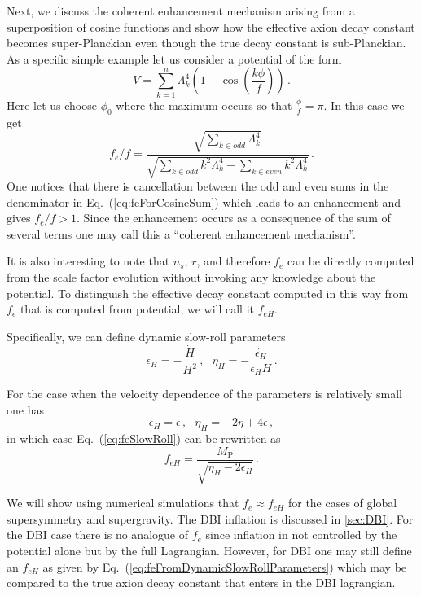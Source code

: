 \documentclass[12pt]{article}
\begin{document}
Next, we discuss the coherent enhancement mechanism arising from a superposition of cosine functions and show how the effective axion decay constant becomes super-Planckian even though the true decay constant is sub-Planckian.
As a specific simple example let us consider a potential of the form
\begin{equation} \label{eq:cosineSumPotential}
  V = \sum_{k = 1}^n \Lambda_k^4 \left(1 - \cos\left(\frac{k\phi}{f}\right)\right)\,.
\end{equation}
Here let us choose $\phi_0$ where the maximum occurs so that $\frac{\phi}{f} = \pi$.
In this case we get
\begin{equation} \label{eq:feForCosineSum}
  {f_e} / f = \frac
    {\sqrt{\sum_{k \in odd} \Lambda_k^4}}
    {\sqrt{\sum_{k \in odd} k^2 \Lambda_k^4 - \sum_{k \in even} k^2 \Lambda_k^4}}\,.
\end{equation}
One notices that there is cancellation between the odd and even sums in the denominator in Eq.~(\ref{eq:feForCosineSum}) which leads to an enhancement and gives $f_e / f > 1$.
Since the enhancement occurs as a consequence of the sum of several terms one may call this a ``coherent enhancement mechanism''.

It is also interesting to note that $n_s$, $r$, and therefore $f_e$ can be directly computed from the scale factor evolution without invoking any knowledge about the potential.
To distinguish the effective decay constant computed in this way from $f_e$ that is computed from potential, we will call it $f_{eH}$.

Specifically, we can define dynamic slow-roll parameters
\begin{equation} \label{eq:slowRollParametersDynamic}
  \epsilon_H = -\frac{\dot H}{H^2}\,,
  ~~~ \eta_H = -\frac{\dot{\epsilon_H}}{\epsilon_H H}\,.
\end{equation}

For the case when the velocity dependence of the parameters is relatively small one has
\begin{equation} \label{eq:slowRollParametersDynamicFromStatic}
  \epsilon_H = \epsilon\,,
  ~~~ \eta_H = -2 \eta + 4 \epsilon\,,
\end{equation}
in which case Eq.~(\ref{eq:feSlowRoll}) can be rewritten as
\begin{equation} \label{eq:feFromDynamicSlowRollParameters}
  f_{eH} = \frac{M_\text{P}}{\sqrt{\eta_H - 2 \epsilon_H}}\,.
\end{equation}

We will show using numerical simulations that $f_e \approx f_{eH}$ for the cases of global supersymmetry and supergravity.
The DBI inflation is discussed in \ref{sec:DBI}.
For the DBI case there is no analogue of $f_e$ since inflation in not controlled by the potential alone but by the full Lagrangian.
However, for DBI one may still define an $f_{eH}$ as given by Eq.~(\ref{eq:feFromDynamicSlowRollParameters}) which may be compared to the true axion decay constant that enters in the DBI lagrangian.
\end{document}
